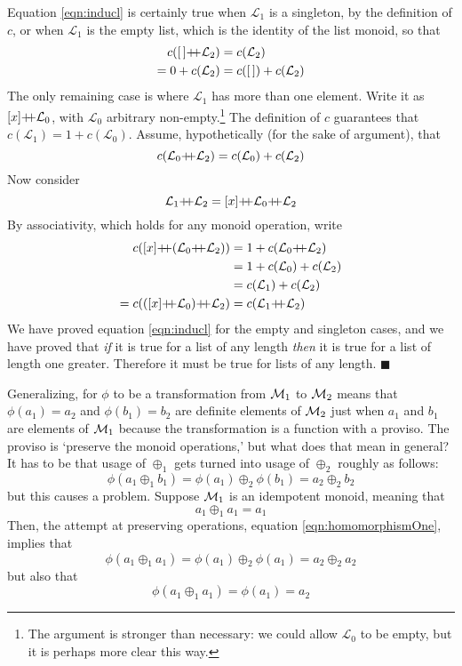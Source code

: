 Equation \ref{eqn:inducl} is certainly true when $\mathcal{L}_{1}$ is a singleton, by the definition of $c$, or when $\mathcal{L}_{1}$ is the empty list, which is the identity of the list monoid, so that
\begin{align*}
  c(\emptylist\pp\mathcal{L}_{2})&=c(\mathcal{L}_{2})\\
  =0+c(\mathcal{L}_{2})&=c(\emptylist)+c(\mathcal{L}_{2})
\end{align*}
The only remaining case is where $\mathcal{L}_{1}$ has more than one element. Write it as $[x]\pp\mathcal{L}_{0}$, with $\mathcal{L}_{0}$ arbitrary non-empty.\footnote{The argument is stronger than necessary: we could allow $\mathcal{L}_{0}$ to be empty, but it is perhaps more clear this way.} The definition of $c$ guarantees that $c(\mathcal{L}_{1})=1+c(\mathcal{L}_{0})$. Assume, hypothetically (for the sake of argument), that 
$$c(\mathcal{L}_{0}\pp\mathcal{L}_{2})=c(\mathcal{L}_{0})+c(\mathcal{L}_{2})$$
Now consider 
$$\mathcal{L}_{1}\pp\mathcal{L}_{2}=[x]\pp\mathcal{L}_{0}\pp\mathcal{L}_{2}$$
By associativity, which holds for any monoid operation, write 
\begin{align*}
  c([x]\pp(\mathcal{L}_{0}\pp\mathcal{L}_{2})) &=
  1+c(\mathcal{L}_{0}\pp\mathcal{L}_{2})\\
  &= 1+c(\mathcal{L}_{0})+c(\mathcal{L}_{2})\\
  &= c(\mathcal{L}_{1})+c(\mathcal{L}_{2})  \\
  =c(([x]\pp\mathcal{L}_{0})\pp\mathcal{L}_{2})
  &=c(\mathcal{L}_{1}\pp\mathcal{L}_{2})
\end{align*} 
We have proved equation \ref{eqn:inducl} for the empty and singleton cases, and we have proved that \emph{if} it is true for a list of any length \emph{then} it is true for a list of length one greater. Therefore it must be true for lists of any length. $\blacksquare$


Generalizing, for $\phi$ to be a transformation from $\mathcal{M}_{1}$ to $\mathcal{M}_{2}$ means that $\phi(a_1)=a_2$ and $\phi(b_1)=b_2$ are definite elements of $\mathcal{M}_{2}$ just when $a_1$ and $b_1$ are elements of $\mathcal{M}_{1}$ because the transformation is a function with a proviso. The proviso is `preserve the monoid operations,' but what does that mean in general? It has to be that usage of $\oplus_1$ gets turned into usage of $\oplus_2$ roughly as follows:
\begin{equation}
  \phi(a_1 \oplus_1 b_1) = \phi(a_1) \oplus_2 \phi(b_1) = a_2 \oplus_2 b_2
  \label{eqn:homomorphismOne}
\end{equation}
but this causes a problem. Suppose $\mathcal{M}_{1}$ is an idempotent monoid, meaning that 
$$a_1 \oplus_1 a_1 = a_1$$
Then, the attempt at preserving operations, equation \ref{eqn:homomorphismOne}, implies that
$$\phi(a_1 \oplus_1 a_1) = \phi(a_1)\oplus_2\phi(a_1)=a_2\oplus_2 a_2$$
but also that
$$\phi(a_1 \oplus_1 a_1) = \phi(a_1)= a_2$$


